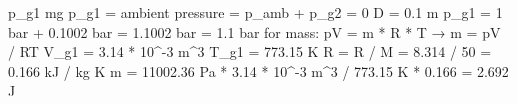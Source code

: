 p_g1 mg
p_g1 = ambient pressure = p_amb + p_g2 = 0
D = 0.1 m
p_g1 = 1 bar + 0.1002 bar = 1.1002 bar = 1.1 bar
for mass: pV = m * R * T → m = pV / RT
V_g1 = 3.14 * 10^-3 m^3
T_g1 = 773.15 K
R = R / M = 8.314 / 50 = 0.166 kJ / kg K
m = 11002.36 Pa * 3.14 * 10^-3 m^3 / 773.15 K * 0.166
= 2.692 J